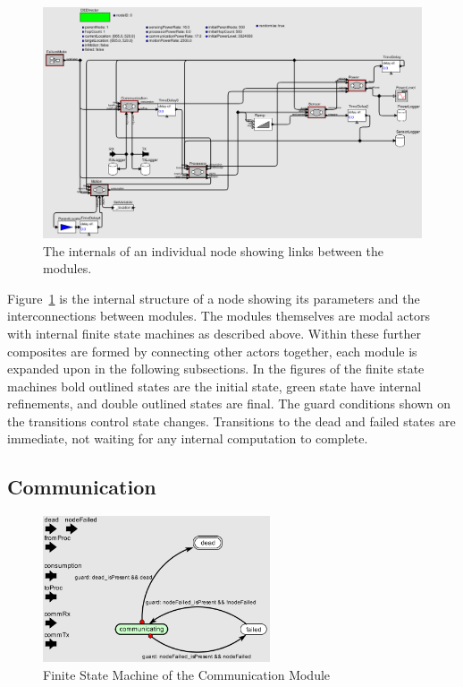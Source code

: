 \documentclass[authoryearcitations]{UoYCSproject}
\begin{document}
\begin{figure}
 \centering
    \includegraphics[width=\textwidth]{figures/Node.png}
    \caption{The internals of an individual node showing links between the modules.}
    \label{fig:node}
\end{figure}

Figure~\ref{fig:node} is the internal structure of a node showing its parameters and the interconnections between modules. The modules themselves are modal actors with internal finite state machines as described above. Within these further composites are formed by connecting other actors together, each module is expanded upon in the following subsections. In the figures of the finite state machines bold outlined states are the initial state, green state have internal refinements, and double outlined states are final. The guard conditions shown on the transitions control state changes. Transitions to the dead and failed states are immediate, not waiting for any internal computation to complete.

\subsection{Communication}

\begin{figure}
 \centering
    \includegraphics[width=0.6\textwidth]{figures/communication_Controller.png}
    \caption{Finite State Machine of the Communication Module}
    \label{fig:commControl}
\end{figure}
\end{document}
